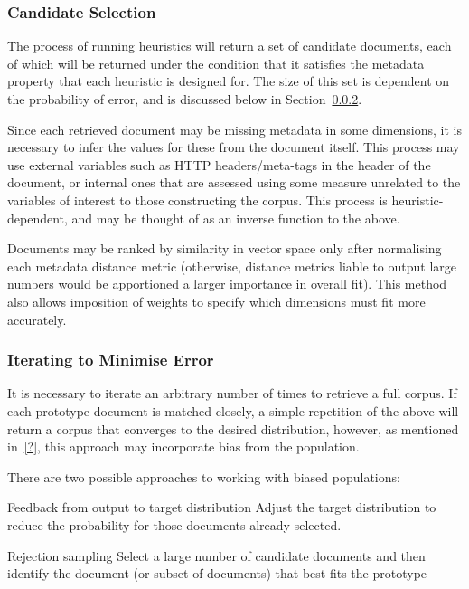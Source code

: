 \subsubsection{Candidate Selection}
The process of running heuristics will return a set of candidate documents, each of which will be returned under the condition that it satisfies the metadata property that each heuristic is designed for.  The size of this set is dependent on the probability of error, and is discussed below in Section~\ref{sec:rebuilding:design:minerr}.

Since each retrieved document may be missing metadata in some dimensions, it is necessary to infer the values for these from the document itself.  This process may use external variables such as HTTP headers/meta-tags in the header of the document, or internal ones that are assessed using some measure unrelated to the variables of interest to those constructing the corpus.  This process is heuristic-dependent, and may be thought of as an inverse function to the above.

Documents may be ranked by similarity in vector space only after normalising each metadata distance metric (otherwise, distance metrics liable to output large numbers would be apportioned a larger importance in overall fit).  This method also allows imposition of weights to specify which dimensions must fit more accurately.


\subsubsection{Iterating to Minimise Error}
\label{sec:rebuilding:design:minerr}
It is necessary to iterate an arbitrary number of times to retrieve a full corpus.  If each prototype document is matched closely, a simple repetition of the above will return a corpus that converges to the desired distribution, however, as mentioned in~\ref{?}, this approach may incorporate bias from the population.

There are two possible approaches to working with biased populations:

\begin{itemizeTitle}
    \item[Feedback from output to target distribution] Adjust the target distribution to reduce the probability for those documents already selected.
    \item[Rejection sampling]  Select a large number of candidate documents and then identify the document (or subset of documents) that best fits the prototype
\end{itemizeTitle}

